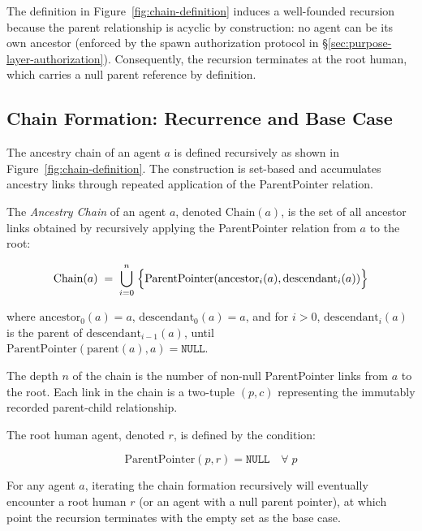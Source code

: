 The definition in Figure~\ref{fig:chain-definition} induces a well-founded recursion because the parent relationship is acyclic by construction: no agent can be its own ancestor (enforced by the spawn authorization protocol in \S\ref{sec:purpose-layer-authorization}). Consequently, the recursion terminates at the root human, which carries a null parent reference by definition.

\subsection{Chain Formation: Recurrence and Base Case}
\label{sec:chain-formation}

The ancestry chain of an agent $a$ is defined recursively as shown in Figure~\ref{fig:chain-definition}. The construction is set-based and accumulates ancestry links through repeated application of the ParentPointer relation.

\begin{definition}
\label{def:ancestry-chain}
The \emph{Ancestry Chain} of an agent $a$, denoted $\text{Chain}(a)$, is the set of all ancestor links obtained by recursively applying the ParentPointer relation from $a$ to the root:

\[
\text{Chain}(a) \;=\; \bigcup_{i=0}^{n} \; \Bigl\{ \text{ParentPointer}(\text{ancestor}_i(a), \text{descendant}_i(a)) \Bigr\}
\]

where $\text{ancestor}_0(a) = a$, $\text{descendant}_0(a) = a$, and for $i > 0$, $\text{descendant}_i(a)$ is the parent of $\text{descendant}_{i-1}(a)$, until $\text{ParentPointer}(\text{parent}(a), a) = \texttt{NULL}$.
\end{definition}

The depth $n$ of the chain is the number of non-null ParentPointer links from $a$ to the root. Each link in the chain is a two-tuple $(p, c)$ representing the immutably recorded parent-child relationship.

\begin{property}
\label{prop:chain-termination}
The root human agent, denoted $r$, is defined by the condition:

\[
\text{ParentPointer}(p, r) = \texttt{NULL} \quad \forall\; p
\]

For any agent $a$, iterating the chain formation recursively will eventually encounter a root human $r$ (or an agent with a null parent pointer), at which point the recursion terminates with the empty set as the base case.
\end{property}

